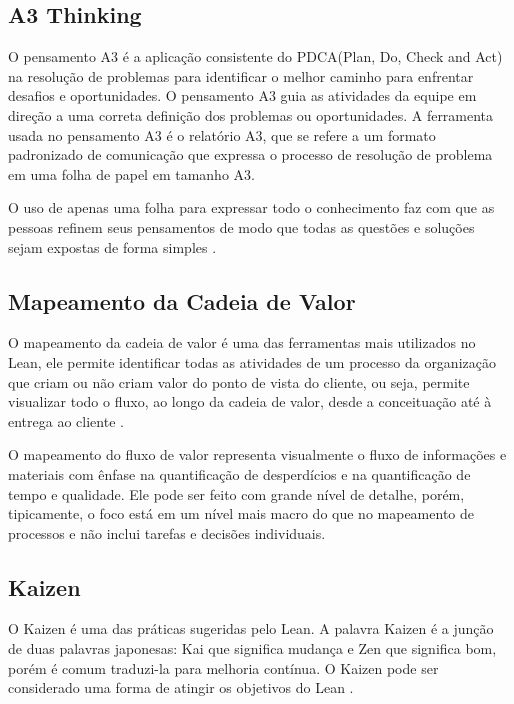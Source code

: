 \begin{anexosenv}
\subsection[A3 Thinking]{A3 Thinking}

O pensamento A3 é a aplicação consistente do PDCA(Plan, Do, Check and Act) na resolução de problemas para identificar o melhor caminho para enfrentar desafios e oportunidades. O pensamento A3 guia as atividades da equipe em direção a uma correta definição dos problemas ou oportunidades. A ferramenta usada no pensamento A3 é o relatório A3, que se refere a um formato padronizado de comunicação que expressa o processo de resolução de problema em uma folha de papel em tamanho A3.

O uso de apenas uma folha para expressar todo o conhecimento faz com que as pessoas refinem seus pensamentos de modo que todas as questões e soluções sejam expostas de forma simples \cite{liker}. 

\subsection[Mapeamento da Cadeia de Valor]{Mapeamento da Cadeia de Valor}

O mapeamento da cadeia de valor é uma das ferramentas mais utilizados no Lean, ele permite identificar todas as atividades de um processo da organização que criam ou não criam valor do ponto de vista do cliente, ou seja, permite visualizar todo o fluxo, ao longo da cadeia de valor, desde a conceituação até à entrega ao cliente \cite{bell2011}.

O mapeamento do fluxo de valor representa visualmente o fluxo de informações e materiais com ênfase na quantificação de desperdícios e na quantificação de tempo e qualidade. Ele pode ser feito com grande nível de detalhe, porém, tipicamente, o foco está em um nível mais macro do que no mapeamento de processos  e não inclui tarefas e decisões individuais.

\subsection[Kaizen]{Kaizen}

O Kaizen é uma das práticas sugeridas pelo Lean. A palavra Kaizen é a junção de duas palavras japonesas: Kai que significa mudança e Zen que significa bom, porém é comum traduzi-la para melhoria contínua. O Kaizen  pode ser considerado uma forma de atingir os objetivos do Lean \cite{bell2011}.


\end{anexosenv}
